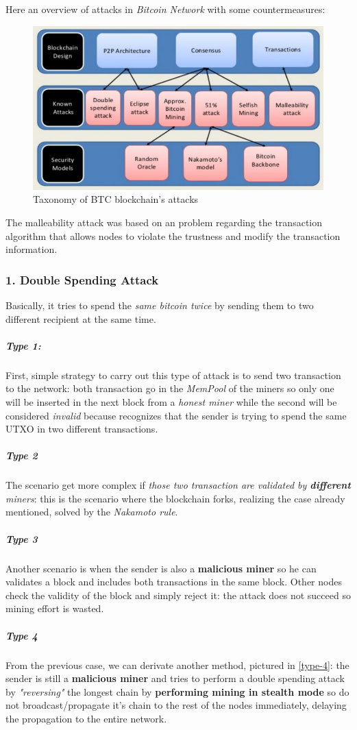\documentclass[10pt,a4paper]{report}
\begin{document}
Here an overview of attacks in \textit{Bitcoin Network} with some countermeasures:
\begin{figure}[h]
	\centering
	\includegraphics[scale=0.50]{images/Pasted image 20230412112839.png}
	\caption{Taxonomy of BTC blockchain's attacks}
\end{figure}

The malleability attack was based on an problem regarding the transaction algorithm that allows nodes to violate the trustness and modify the transaction information.
\subsubsection{1. Double Spending Attack}\label{sec:1-double-spending-attack}
Basically, it tries to spend the \textit{same bitcoin twice} by sending them to two different recipient at the same time.
\subparagraph{\textbf{Type 1}:}\label{sec:}
First, simple strategy to carry out this type of attack is to send two transaction to the network: both transaction go in the \textit{MemPool} of the miners so only one will be inserted in the next block from a \textit{honest miner} while the second will be considered \textit{invalid} because recognizes that the sender is trying to spend the same UTXO in two different transactions.
\subparagraph{Type 2}\label{sec:type-2}
The scenario get more complex if \textit{those two transaction are validated by \textbf{different} miners}: this is the scenario where the blockchain forks, realizing the case already mentioned, solved by the \textit{Nakamoto rule}.
\subparagraph{Type 3}\label{sec:type-3}
Another scenario is when the sender is also a \textbf{malicious miner} so he can validates a block and includes both transactions in the same block. Other nodes check the validity of the block and simply reject it: the attack does not succeed so mining effort is wasted.
\subparagraph{Type 4}\label{sec:type-4}
From the previous case, we can derivate another method, pictured in \ref{type-4}: the sender is still a \textbf{malicious miner} and tries to perform a double spending attack by \textit{"reversing"} the longest chain by \textbf{performing mining in stealth mode} so do not broadcast/propagate it's chain to the rest of the nodes immediately, delaying the propagation to the entire network.
\end{document}
